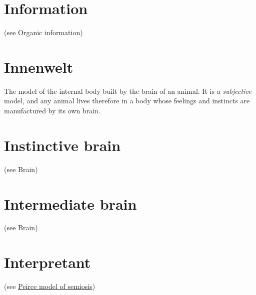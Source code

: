\documentclass[12pt]{article}
\begin{document}
\section{Information} (see Organic information) 


\section{Innenwelt}
The model of the internal body built by the brain of an animal. It is a \textit{subjective} model, and any animal lives therefore in a body whose feelings and instincts are manufactured by its own brain.


\section{Instinctive brain} (see Brain)


\section{Intermediate brain} (see Brain)


\section{Interpretant} (see \hyperlink{peirce_model_of_semiosis}{Peirce model of semiosis})
\end{document}
